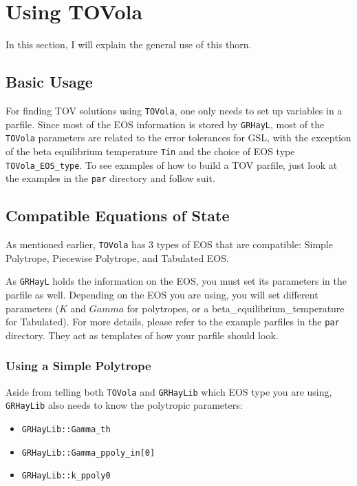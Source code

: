 \section{Using TOVola}

In this section, I will explain the general use of this thorn. 

\subsection{Basic Usage}

For finding TOV solutions using \texttt{TOVola}, one only needs to set up variables in a parfile. Since most of the EOS information is stored by \texttt{GRHayL}, most of the \texttt{TOVola} parameters are related to the error tolerances for GSL, with the exception of the beta equilibrium temperature \texttt{Tin} and the choice of EOS type \texttt{TOVola\_EOS\_type}. To see examples of how to build a TOV parfile, just look at the examples in the \texttt{par} directory and follow suit.

\subsection{Compatible Equations of State}

As mentioned earlier, \texttt{TOVola} has 3 types of EOS that are compatible: Simple Polytrope, Piecewise Polytrope, and Tabulated EOS.

As \texttt{GRHayL}\cite{TOVola_TOVola_GRHayL} holds the information on the EOS, you must set its parameters in the parfile as well. Depending on the EOS you are using, you will set different parameters ($K$ and $Gamma$ for polytropes, or a beta\_equilibrium\_temperature for Tabulated). For more details, please refer to the example parfiles in the \texttt{par} directory. They act as templates of how your parfile should look.

\subsubsection{Using a Simple Polytrope}

Aside from telling both \texttt{TOVola} and \texttt{GRHayLib} which EOS type you are using, \texttt{GRHayLib} also needs to know the polytropic parameters:

\begin{itemize}
    \item \texttt{GRHayLib::Gamma\_th}
    \item \texttt{GRHayLib::Gamma\_ppoly\_in[0]}
    \item \texttt{GRHayLib::k\_ppoly0}
\end{itemize}

